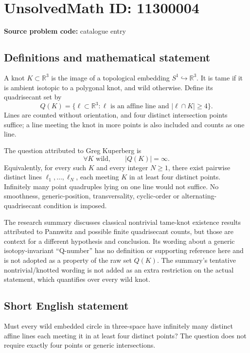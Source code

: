 \documentclass[11pt]{article}
\newcommand{\R}{\mathbb{R}}
\begin{document}
\section*{UnsolvedMath ID: 11300004}
\textbf{Source problem code:} catalogue entry
\subsection{Definitions and mathematical statement}
A knot \(K\subset\R^3\) is the image of a topological embedding \(S^1\hookrightarrow\R^3\). It is tame if it is ambient isotopic to a polygonal knot, and wild otherwise. Define its quadrisecant set by
\[Q(K)=\{\ell\subset\R^3:\ell\text{ is an affine line and }|\ell\cap K|\geq4\}.\]
Lines are counted without orientation, and four distinct intersection points suffice; a line meeting the knot in more points is also included and counts as one line.

The question attributed to Greg Kuperberg is
\[\forall K\text{ wild},\qquad |Q(K)|=\infty.\]
Equivalently, for every such \(K\) and every integer \(N\geq1\), there exist pairwise distinct lines \(\ell_1,\ldots,\ell_N\), each meeting \(K\) in at least four distinct points. Infinitely many point quadruples lying on one line would not suffice. No smoothness, generic-position, transversality, cyclic-order or alternating-quadrisecant condition is imposed.

The research summary discusses classical nontrivial tame-knot existence results attributed to Pannwitz and possible finite quadrisecant counts, but those are context for a different hypothesis and conclusion. Its wording about a generic isotopy-invariant ``Q-number'' has no definition or supporting reference here and is not adopted as a property of the raw set \(Q(K)\). The summary's tentative nontrivial/knotted wording is not added as an extra restriction on the actual statement, which quantifies over every wild knot.
\subsection{Short English statement}
Must every wild embedded circle in three-space have infinitely many distinct affine lines each meeting it in at least four distinct points? The question does not require exactly four points or generic intersections.
\end{document}
